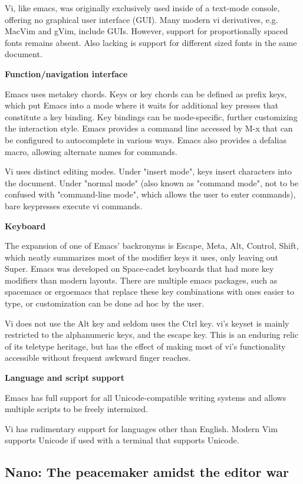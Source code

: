 Vi, like emacs, was originally exclusively used inside of a text-mode console, offering no graphical user interface (GUI). Many modern vi derivatives, e.g. MacVim and gVim, include GUIs. However, support for proportionally spaced fonts remains absent. Also lacking is support for different sized fonts in the same document.

\textbf{Function/navigation interface}

Emacs uses metakey chords. Keys or key chords can be defined as prefix keys, which put Emacs into a mode where it waits for additional key presses that constitute a key binding. Key bindings can be mode-specific, further customizing the interaction style. Emacs provides a command line accessed by M-x that can be configured to autocomplete in various ways. Emacs also provides a defalias macro, allowing alternate names for commands.

Vi uses distinct editing modes. Under "insert mode", keys insert characters into the document. Under "normal mode" (also known as "command mode", not to be confused with "command-line mode", which allows the user to enter commands), bare keypresses execute vi commands.

\textbf{Keyboard}

The expansion of one of Emacs' backronyms is Escape, Meta, Alt, Control, Shift, which neatly summarizes most of the modifier keys it uses, only leaving out Super. Emacs was developed on Space-cadet keyboards that had more key modifiers than modern layouts. There are multiple emacs packages, such as spacemacs or ergoemacs that replace these key combinations with ones easier to type, or customization can be done ad hoc by the user.

Vi does not use the Alt key and seldom uses the Ctrl key. vi's keyset is mainly restricted to the alphanumeric keys, and the escape key. This is an enduring relic of its teletype heritage, but has the effect of making most of vi's functionality accessible without frequent awkward finger reaches.

\textbf{Language and script support}

Emacs has full support for all Unicode-compatible writing systems and allows multiple scripts to be freely intermixed.

Vi has rudimentary support for languages other than English. Modern Vim supports Unicode if used with a terminal that supports Unicode.

\subsection{Nano: The peacemaker amidst the editor war}

